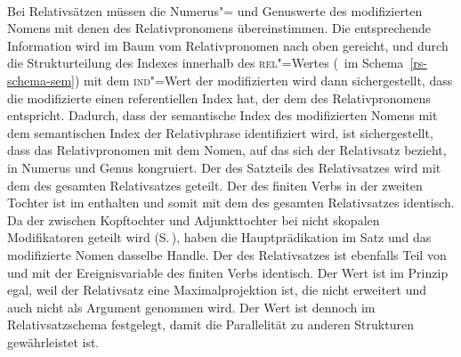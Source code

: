 \begin{schema}
\label{rs-schema-sem}
 \impl\\
\end{schema}

\noindent
%
Bei Relativsätzen müssen die Numerus"= und Genuswerte des modifizierten Nomens mit denen des Relativpronomens
übereinstimmen. Die entsprechende Information wird im Baum vom Relativpronomen nach oben gereicht, und durch die Strukturteilung
des Indexes innerhalb des \textsc{rel}"=Wertes (\, im Schema~\ref{rs-schema-sem}) mit dem \textsc{ind}"=Wert der
modifizierten \nbar wird dann sichergestellt, dass die modifizierte \nbar einen referentiellen Index
hat, der dem des Relativpronomens entspricht. Dadurch, dass der semantische 
Index des modifizierten Nomens  mit dem semantischen Index der Relativphrase identifiziert wird,
ist sichergestellt, dass das Relativpronomen mit dem Nomen, auf das sich der Relativsatz bezieht, in
Numerus und Genus kongruiert. Der \contw des Satzteils des Relativsatzes wird mit dem \contw des
gesamten Relativsatzes  geteilt. Der \ltopw des finiten Verbs in der zweiten Tochter ist im \contw enthalten und somit mit dem \ltopw des gesamten Relativsatzes identisch. Da der \ltopw zwischen Kopftochter und Adjunkttochter bei
nicht skopalen Modifikatoren geteilt wird
(S.\,\pageref{Semantikprinzip-nicht-skopaleTochter-LTOP}), haben die Hauptprädikation im Satz und
das modifizierte Nomen dasselbe Handle. Der \indw des Relativsatzes ist ebenfalls Teil von \cont und
mit der Ereignisvariable des finiten Verbs identisch. Der Wert ist im Prinzip egal, weil der
Relativsatz eine Maximalprojektion ist, die nicht erweitert und auch nicht 
als Argument genommen wird. Der Wert ist dennoch im Relativsatzschema festgelegt, damit die
Parallelität zu anderen Strukturen gewährleistet ist.
\largerpage

